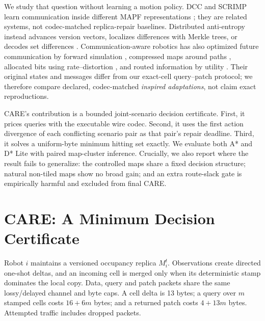 \documentclass[conference]{IEEEtran}
\begin{document}
We study that question without learning a motion policy. DCC and SCRIMP learn
communication inside different MAPF representations
\cite{ma2021dcc,wang2023scrimp}; they are related systems, not codec-matched
replica-repair baselines. Distributed anti-entropy instead advances version
vectors, localizes differences with Merkle trees, or decodes set differences
\cite{vanrenesse2008scuttlebutt,decandia2007dynamo,goodrich2011iblt}.
Communication-aware robotics has also optimized future communication by
forward simulation \cite{marcotte2020ocbc}, compressed maps around paths
\cite{psomiadis2023compression}, allocated bits using rate--distortion
\cite{psomiadis2025ratedistortion}, and routed information by utility
\cite{barcis2021utility}. Their original states and messages differ from our
exact-cell query--patch protocol; we therefore compare declared, codec-matched
\emph{inspired adaptations}, not claim exact reproductions.

CARE's contribution is a bounded joint-scenario decision certificate. First,
it prices queries with the executable wire codec. Second, it uses the first
action divergence of each conflicting scenario pair as that pair's repair
deadline. Third, it solves a uniform-byte minimum hitting set exactly. We
evaluate both A* and D* Lite with paired map-cluster inference. Crucially, we
also report where the result fails to generalize: the controlled maps share a
fixed decision structure; natural non-tiled maps show no broad gain; and an
extra route-slack gate is empirically harmful and excluded from final CARE.

\section{CARE: A Minimum Decision Certificate}
Robot $i$ maintains a versioned occupancy replica $M_i^t$. Observations create
directed one-shot deltas, and an incoming cell is merged only when its
deterministic stamp dominates the local copy. Data, query and patch packets
share the same lossy/delayed channel and byte caps. A cell delta is 13 bytes; a
query over $m$ stamped cells costs $16+6m$ bytes; and a returned patch costs
$4+13m$ bytes. Attempted traffic includes dropped packets.
\end{document}
